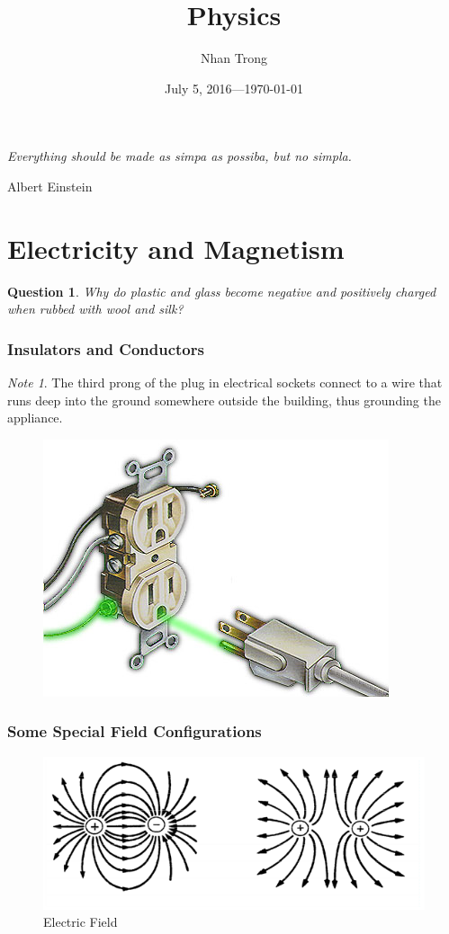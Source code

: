\documentclass[12pt]{article}
\title{Physics}
\author{Nhan Trong}
\date{July 5, 2016---\today}                                           %
\theoremstyle{plain}
\newtheorem{question}[theorem]{Question}
\theoremstyle{definition}
\theoremstyle{remark}
\newtheorem{note}[theorem]{Note}
\begin{document}
\sloppy
\maketitle

\epigraph{\textit{Everything should be made as simpa as possiba, but no simpla.}}{Albert Einstein}

\tableofcontents %

\part{Electricity and Magnetism}

\begin{question}
Why do plastic and glass become negative and positively charged when rubbed with wool and silk?
\end{question}

\section{Insulators and Conductors}

\begin{note}
The third prong of the plug in electrical sockets connect to a wire that runs deep into the ground somewhere outside the building, thus grounding the appliance.
\end{note}

\begin{figure}[H]
\centering
\includegraphics[width=.5\textwidth]{sg3p}
\end{figure}

\section{Some Special Field Configurations}

\begin{figure}[H]
\centering
\includegraphics[width=1.0\textwidth]{201518-14415791-1040-instructionallab_manualsphysics6bexperiment_56b-exp4_fig2}
\caption{Electric Field}
\end{figure}
\end{document}
